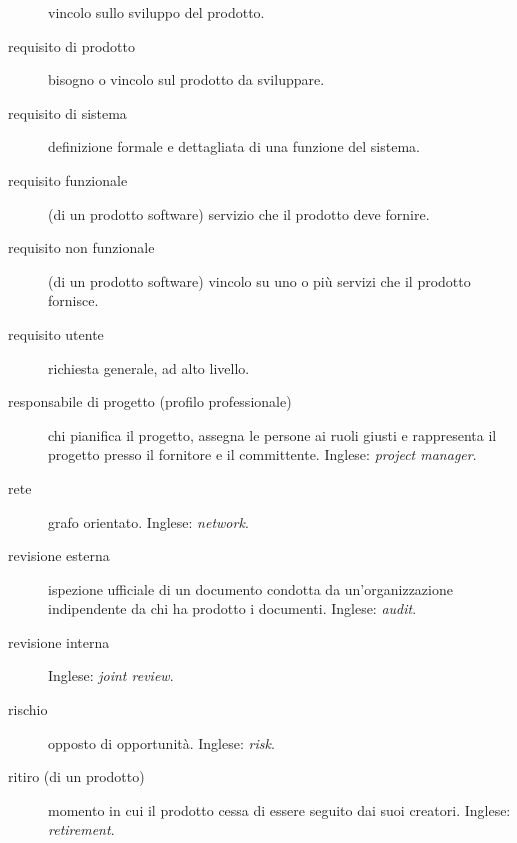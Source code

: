 \documentclass[a4paper]{article}
\begin{document}
\begin{description}
			vincolo sullo sviluppo del prodotto.
			
	\item[requisito di prodotto] 

			bisogno o vincolo sul prodotto da sviluppare.
			
	\item[requisito di sistema] 

			definizione formale e dettagliata di una funzione del sistema.
			
	\item[requisito funzionale] 

			(di un prodotto software) servizio che il prodotto deve fornire.
			
	\item[requisito non funzionale] 

			(di un prodotto software) vincolo su uno o più servizi che il prodotto fornisce.
			
	\item[requisito utente] 

			richiesta generale, ad alto livello.
			
	\item[responsabile di progetto (profilo professionale)] 

			chi pianifica il progetto, assegna le persone ai ruoli giusti e rappresenta il progetto presso il fornitore e il committente. Inglese: \emph{project manager}.
			
	\item[rete] 

			grafo orientato. Inglese: \emph{network}.
			
	\item[revisione esterna] 

			ispezione ufficiale di un documento condotta da un'organizzazione indipendente da chi ha prodotto i documenti. Inglese: \emph{audit}.
			
	\item[revisione interna] 

			 Inglese: \emph{joint review}.
			
	\item[rischio] 

			opposto di opportunità. Inglese: \emph{risk}.
			
	\item[ritiro (di un prodotto)] 

			momento in cui il prodotto cessa di essere seguito dai suoi creatori. Inglese: \emph{retirement}.
			

\end{description}
\end{document}
